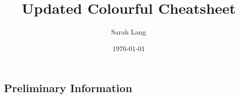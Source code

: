 \documentclass[10pt,a4paper]{article}
\title{\color{w3schools}Updated {\color{alert} Colourful} {\color{black} Cheatsheet}}
\author{Sarah Lang}
\date{\today}
\begin{document}
\small
\begin{multicols}{3}

\maketitle
\thispagestyle{empty}
\scriptsize
\tableofcontents

\section{Preliminary Information}
% 




\AtNextBibliography{\footnotesize}
\printbibliography  
\end{multicols}
\end{document}
